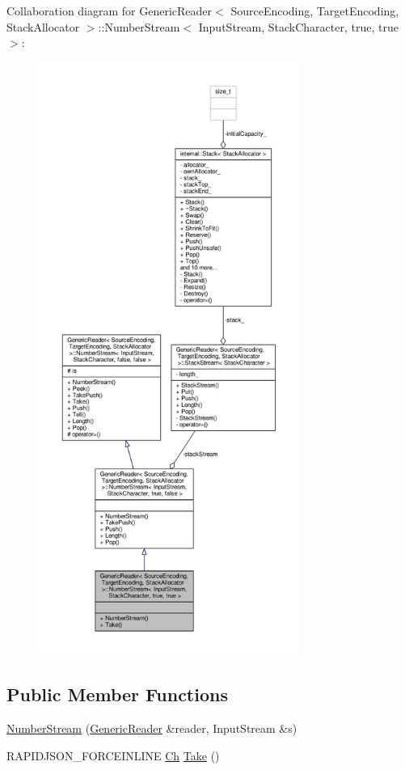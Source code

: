 Collaboration diagram for Generic\+Reader$<$ Source\+Encoding, Target\+Encoding, Stack\+Allocator $>$\+:\+:Number\+Stream$<$ Input\+Stream, Stack\+Character, true, true $>$\+:
\nopagebreak
\begin{figure}[H]
\begin{center}
\leavevmode
\includegraphics[height=550pt]{classGenericReader_1_1NumberStream_3_01InputStream_00_01StackCharacter_00_01true_00_01true_01_4__coll__graph}
\end{center}
\end{figure}
\subsection*{Public Member Functions}
\begin{DoxyCompactItemize}
\item 
\hyperlink{classGenericReader_1_1NumberStream_3_01InputStream_00_01StackCharacter_00_01true_00_01true_01_4_a27dfcc4bc4a1bdaac83d08e028258b59}{Number\+Stream} (\hyperlink{classGenericReader}{Generic\+Reader} \&reader, Input\+Stream \&s)
\item 
R\+A\+P\+I\+D\+J\+S\+O\+N\+\_\+\+F\+O\+R\+C\+E\+I\+N\+L\+I\+NE \hyperlink{classGenericReader_1_1NumberStream_3_01InputStream_00_01StackCharacter_00_01false_00_01false_01_4_a2971d286306cf8df899b87ea9dd24f27}{Ch} \hyperlink{classGenericReader_1_1NumberStream_3_01InputStream_00_01StackCharacter_00_01true_00_01true_01_4_a8d8589335bf009557f2d486751aa2f63}{Take} ()
\end{DoxyCompactItemize}
